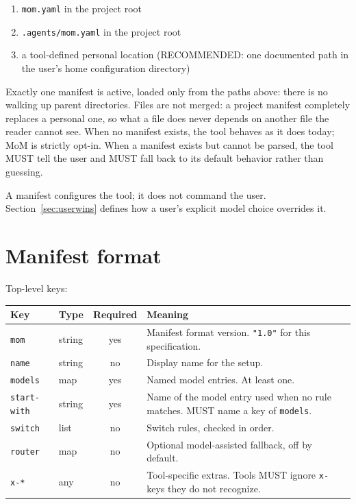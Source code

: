 \documentclass[11pt]{article}
\newcommand{\key}[1]{\texttt{#1}}
\begin{document}
\begin{enumerate}
  \item \key{mom.yaml} in the project root
  \item \key{.agents/mom.yaml} in the project root
  \item a tool-defined personal location (RECOMMENDED: one documented path in
        the user's home configuration directory)
\end{enumerate}

Exactly one manifest is active, loaded only from the paths above: there
is no walking up parent directories. Files are not merged: a project
manifest completely replaces a personal one, so what a file does never
depends on another file the reader cannot see. When no manifest exists, the tool
behaves as it does today; MoM is strictly opt-in. When a manifest exists
but cannot be parsed, the tool MUST tell the user and MUST fall back to
its default behavior rather than guessing.

A manifest configures the tool; it does not command the user.
Section~\ref{sec:userwins} defines how a user's explicit model choice
overrides it.

\section{Manifest format}

Top-level keys:

\begin{tabularx}{\textwidth}{@{}llcX@{}}
\toprule
Key & Type & Required & Meaning \\
\midrule
\key{mom} & string & yes & Manifest format version. \key{"1.0"} for this specification. \\
\key{name} & string & no & Display name for the setup. \\
\key{models} & map & yes & Named model entries. At least one. \\
\key{start-with} & string & yes & Name of the model entry used when no rule matches. MUST name a key of \key{models}. \\
\key{switch} & list & no & Switch rules, checked in order. \\
\key{router} & map & no & Optional model-assisted fallback, off by default. \\
\key{x-*} & any & no & Tool-specific extras. Tools MUST ignore \key{x-} keys they do not recognize. \\
\bottomrule
\end{tabularx}
\end{document}
